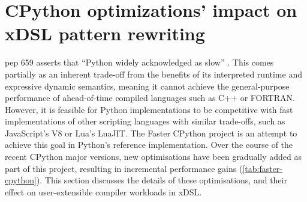 \chapter{CPython optimizations' impact on xDSL pattern rewriting}
\label{chap:impact-cpython-pattern-rewriting}

\acf{pep} 659 asserts that ``Python widely acknowledged as slow'' \cite{pep659}.
This comes partially as an inherent trade-off from the benefits of its interpreted runtime and expressive dynamic semantics, meaning it cannot achieve the general-purpose performance of ahead-of-time compiled languages such as C++ or FORTRAN. However, it is feasible for Python implementations to be competitive with fast implementations of other scripting languages with similar trade-offs, such as JavaScript's V8 or Lua's LuaJIT. The Faster CPython project is an attempt to achieve this goal in Python's reference implementation. Over the course of the recent CPython major versions, new optimisations have been gradually added as part of this project, resulting in incremental performance gains (\autoref{tab:faster-cpython}).
This section discusses the details of these optimisations, and their effect on user-extensible compiler workloads in xDSL.


